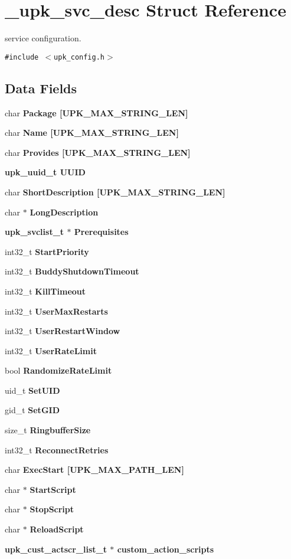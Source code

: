 \section{\_\-upk\_\-svc\_\-desc Struct Reference}
\label{struct__upk__svc__desc}
service configuration.  


{\tt \#include $<$upk\_\-config.h$>$}

\subsection*{Data Fields}
\begin{CompactItemize}
\item 
char \bf{Package} [UPK\_\-MAX\_\-STRING\_\-LEN]
\item 
char \bf{Name} [UPK\_\-MAX\_\-STRING\_\-LEN]
\item 
char \bf{Provides} [UPK\_\-MAX\_\-STRING\_\-LEN]
\item 
\bf{upk\_\-uuid\_\-t} \bf{UUID}
\item 
char \bf{Short\-Description} [UPK\_\-MAX\_\-STRING\_\-LEN]
\item 
char $\ast$ \bf{Long\-Description}
\item 
\bf{upk\_\-svclist\_\-t} $\ast$ \bf{Prerequisites}
\item 
int32\_\-t \bf{Start\-Priority}
\item 
int32\_\-t \bf{Buddy\-Shutdown\-Timeout}
\item 
int32\_\-t \bf{Kill\-Timeout}
\item 
int32\_\-t \bf{User\-Max\-Restarts}
\item 
int32\_\-t \bf{User\-Restart\-Window}
\item 
int32\_\-t \bf{User\-Rate\-Limit}
\item 
bool \bf{Randomize\-Rate\-Limit}
\item 
uid\_\-t \bf{Set\-UID}
\item 
gid\_\-t \bf{Set\-GID}
\item 
size\_\-t \bf{Ringbuffer\-Size}
\item 
int32\_\-t \bf{Reconnect\-Retries}
\item 
char \bf{Exec\-Start} [UPK\_\-MAX\_\-PATH\_\-LEN]
\item 
char $\ast$ \bf{Start\-Script}
\item 
char $\ast$ \bf{Stop\-Script}
\item 
char $\ast$ \bf{Reload\-Script}
\item 
\bf{upk\_\-cust\_\-actscr\_\-list\_\-t} $\ast$ \bf{custom\_\-action\_\-scripts}

\end{CompactItemize}
